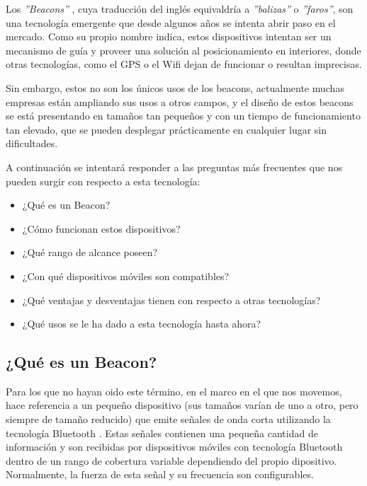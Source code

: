 Los \textit{''Beacons''} \cite{URL::Beacon}, cuya traducción del inglés equivaldría a \textit{''balizas''} o \textit{''faros''}, son una tecnología emergente que desde algunos años se intenta abrir paso en el mercado. Como su propio nombre indica, estos dispositivos intentan ser un mecanismo de guía y proveer una solución al posicionamiento en interiores, donde otras tecnologías, como el GPS o el Wifi dejan de funcionar o resultan imprecisas. 

Sin embargo, estos no son los únicos usos de los beacons, actualmente muchas empresas están ampliando sus usos a otros campos, y el diseño de estos beacons se está presentando en tamaños tan pequeños y con un tiempo de funcionamiento tan elevado, que se pueden desplegar prácticamente en cualquier lugar sin dificultades.

A continuación se intentará responder a las preguntas más frecuentes que nos pueden surgir con respecto a esta tecnología:


\begin{itemize}
\item ¿Qué es un Beacon?
\item ¿Cómo funcionan estos dispositivos?
\item ¿Qué rango de alcance poseen?
\item ¿Con qué dispositivos móviles son compatibles? 
\item ¿Qué ventajas y desventajas tienen con respecto a otras tecnologías?
\item ¿Qué usos se le ha dado a esta tecnología hasta ahora?
\end{itemize}

\begin{figure}[!h]
        \begin{floatrow}
        \end{floatrow}
\end{figure}

\subsection{¿Qué es un Beacon?}

Para los que no hayan oido este término, en el marco en el que nos movemos, hace referencia a un pequeño dispositivo (sus tamaños varían de uno a otro, pero siempre de tamaño reducido) que emite señales de onda corta utilizando la tecnología Bluetooth \cite{URL::Bluetooth}. Estas señales contienen una pequeña cantidad de información y son recibidas por dispositivos móviles con tecnología Bluetooth dentro de un rango de cobertura variable dependiendo del propio dipositivo. Normalmente, la fuerza de esta señal y su frecuencia son configurables.

